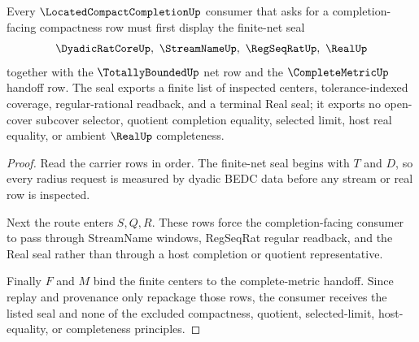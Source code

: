 \begin{theorem}
\label{thm:located-compact-completion-finite-net-seal}
Every $\LocatedCompactCompletionUp$ consumer that asks for a completion-facing compactness row must first display the finite-net seal
$$
\DyadicRatCoreUp,\ \StreamNameUp,\ \RegSeqRatUp,\ \RealUp
$$
together with the $\TotallyBoundedUp$ net row and the $\CompleteMetricUp$ handoff row. The seal exports a finite list of inspected centers, tolerance-indexed coverage, regular-rational readback, and a terminal Real seal; it exports no open-cover subcover selector, quotient completion equality, selected limit, host real equality, or ambient $\RealUp$ completeness.
\end{theorem}
\begin{proof}
Read the carrier rows in order. The finite-net seal begins with $T$ and $D$, so every radius request is measured by dyadic BEDC data before any stream or real row is inspected.

Next the route enters $S,Q,R$. These rows force the completion-facing consumer to pass through StreamName windows, RegSeqRat regular readback, and the Real seal rather than through a host completion or quotient representative.

Finally $F$ and $M$ bind the finite centers to the complete-metric handoff. Since replay and provenance only repackage those rows, the consumer receives the listed seal and none of the excluded compactness, quotient, selected-limit, host-equality, or completeness principles.
\end{proof}

